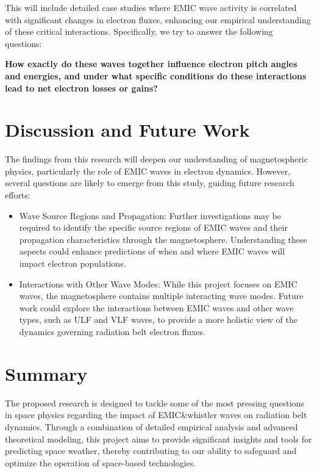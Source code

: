 \documentclass[
  letterpaper,
  DIV=11,
  numbers=noendperiod]{scrartcl}
\begin{document}
This will include detailed case studies where EMIC wave activity is correlated with significant changes in electron fluxes, enhancing our empirical understanding of these critical interactions. Specifically, we try to answer the following questions:

\textbf{How exactly do these waves together influence electron pitch angles and energies, and under what specific conditions do these interactions lead to net electron losses or gains?}

\section{Discussion and Future Work}\label{discussion-and-future-work}

The findings from this research will deepen our understanding of magnetospheric physics, particularly the role of EMIC waves in electron dynamics. However, several questions are likely to emerge from this study, guiding future research efforts:

\begin{itemize}
\item
  Wave Source Regions and Propagation: Further investigations may be required to identify the specific source regions of EMIC waves and their propagation characteristics through the magnetosphere. Understanding these aspects could enhance predictions of when and where EMIC waves will impact electron populations.
\item
  Interactions with Other Wave Modes: While this project focuses on EMIC waves, the magnetosphere contains multiple interacting wave modes. Future work could explore the interactions between EMIC waves and other wave types, such as ULF and VLF waves, to provide a more holistic view of the dynamics governing radiation belt electron fluxes.
\end{itemize}

\section{Summary}\label{summary}

The proposed research is designed to tackle some of the most pressing questions in space physics regarding the impact of EMIC\&whistler waves on radiation belt dynamics. Through a combination of detailed empirical analysis and advanced theoretical modeling, this project aims to provide significant insights and tools for predicting space weather, thereby contributing to our ability to safeguard and optimize the operation of space-based technologies.
\end{document}

